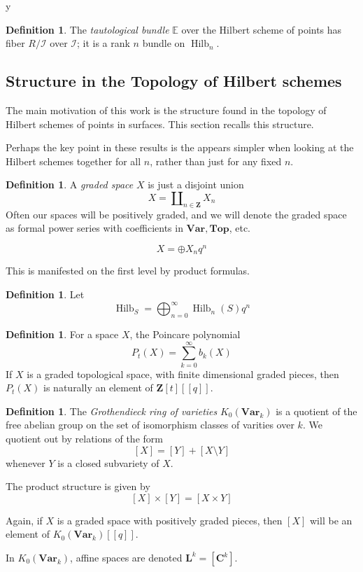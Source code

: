 y\documentclass{amsart}[12pt]
\theoremstyle{definition}
\newtheorem{definition}[dummy]{Definition}
\newcommand{\Z}{\mathbf{Z}}
\newcommand{\C}{\mathbf{C}}
\newcommand{\LL}{\mathbf{L}}
\newcommand{\Var}{\mathbf{Var}}
\newcommand{\Top}{\mathbf{Top}}
\DeclareMathOperator{\Hilb}{Hilb}
\newcommand{\HG}{\Hilb}
\begin{document}
\begin{definition}
The \emph{tautological bundle} $\mathbb{E}$ over the Hilbert scheme of points has fiber $R/\mathcal{I}$ over $\mathcal{I}$; it is a rank $n$ bundle on $\Hilb_n$.
\end{definition}


\subsection{Structure in the Topology of Hilbert schemes}


The main motivation of this work is the structure found in the topology of Hilbert schemes of points in surfaces.  This section recalls this structure.

Perhaps the key point in these results is the appears simpler when looking at the Hilbert schemes together for all $n$, rather than just for any fixed $n$.  

\begin{definition}
A \emph{graded space} $X$ is just a disjoint union $$X=\amalg_{n\in\Z} X_n$$
Often our spaces will be positively graded, and we will denote the graded space as formal power series with coefficients in $\Var, \Top$, etc.

$$X=\oplus X_nq^n$$
\end{definition}


This is manifested on the first level by product formulas.  
\begin{definition}
Let 
$$\HG_S=\bigoplus_{n=0}^\infty \Hilb_n(S)q^n$$
\end{definition}

\begin{definition}
For a space $X$, the Poincare polynomial 
$$P_t(X)=\sum_{k=0}^\infty b_k(X)$$
If $X$ is a graded topological space, with finite dimensional graded pieces, then $P_t(X)$ is naturally an element of $\Z[t][[q]]$.
\end{definition}


\begin{definition}
The \emph{Grothendieck ring of varieties} $K_0(\Var_k)$ is a quotient of the free abelian group on the set of isomorphism classes of varities over $k$.  We quotient out by relations of the form
$$[X]=[Y]+[X\setminus Y]$$
whenever $Y$ is a closed subvariety of $X$.   

The product structure is given by
$$[X]\times [Y]=[X\times Y]$$

Again, if $X$ is a graded space with positively graded pieces, then $[X]$ will be an element of $K_0(\Var_k)[[q]]$.

In $K_0(\Var_k)$, affine spaces are denoted $\LL^k=[\C^k]$.

\end{definition}
\end{document}
